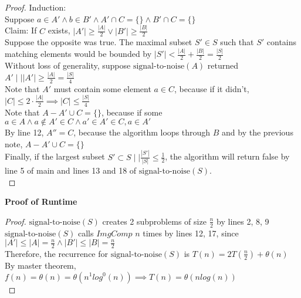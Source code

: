 \begin{problem}
\begin{proof}
    Induction: \\
    Suppose $a \in A' \land b \in B' \land A' \cap C = \{\} \land B' \cap C = \{\}$ \\
    Claim: If $C$ exists, $|A'| \geq \frac{|A|}{2} \lor |B'| \geq \frac{|B|}{2}$ \\
    Suppose the opposite was true. The maximal subset $S' \in S$ such that $S'$ contains matching elements would be bounded by $|S'| < \frac{|A|}{2} + \frac{|B|}{2} = \frac{|S|}{2}$ \\
    Without loss of generality, suppose $\text{signal-to-noise}(A)$ returned $A' \mid| |A'| \geq \frac{|A|}{2} = \frac{|S|}{4}$ \\
    Note that $A'$ must contain some element $a \in C$, because if it didn't, $|C| \leq 2 \cdot \frac{|A|}{2} \implies |C| \leq \frac{|S|}{4}$ \\
    Note that $A - A' \cup C = \{\}$, because if some $a \in A \land a \not\in A' \in C \land a' \in A' \in C, a \in A'$ \\
    By line 12, $A'' = C$, because the algorithm loops through $B$ and by the previous note, $A - A' \cup C = \{\}$ \\
    Finally, if the largest subset $S' \subset S \mid| \frac{|S'|}{|S|} \leq \frac{1}{2}$, the algorithm will return false by line 5 of main and lines 13 and 18 of $\text{signal-to-noise}(S)$. \\
  \end{proof}
  \noindent
  \textbf{Proof of Runtime}
  \begin{proof}
    $\text{signal-to-noise}(S)$ creates 2 subproblems of size $\frac{n}{2}$ by lines 2, 8, 9 \\
    $\text{signal-to-noise}(S)$ calls $ImgComp$ $n$ times by lines 12, 17, since $|A'| \leq |A| = \frac{n}{2} \land |B'| \leq |B| = \frac{n}{2}$\\
    Therefore, the recurrence for $\text{signal-to-noise}(S)$ is $T(n) = 2T(\frac{n}{2}) + \theta(n)$ \\
    By master theorem, $f(n) = \theta(n) = \theta(n^1log^0(n)) \implies T(n) = \theta(nlog(n))$ \\
  \end{proof}
\end{problem}

